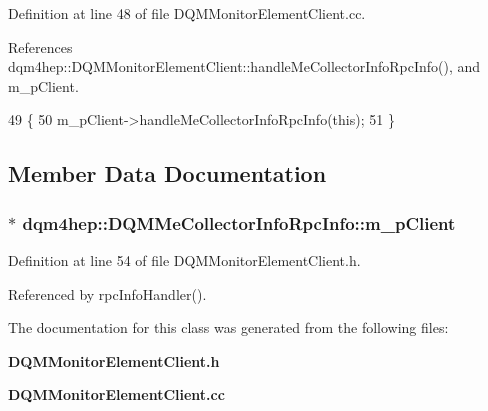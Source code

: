 Definition at line 48 of file D\+Q\+M\+Monitor\+Element\+Client.\+cc.



References dqm4hep\+::\+D\+Q\+M\+Monitor\+Element\+Client\+::handle\+Me\+Collector\+Info\+Rpc\+Info(), and m\+\_\+p\+Client.


\begin{DoxyCode}
49 \{
50   m_pClient->handleMeCollectorInfoRpcInfo(\textcolor{keyword}{this});
51 \}
\end{DoxyCode}


\subsection{Member Data Documentation}
\subsubsection[{m\+\_\+p\+Client}]{$\ast$ dqm4hep\+::\+D\+Q\+M\+Me\+Collector\+Info\+Rpc\+Info\+::m\+\_\+p\+Client\hspace{0.3cm}{\ttfamily [private]}}\label{classdqm4hep_1_1DQMMeCollectorInfoRpcInfo_a38dfa3df9389017c4cf14d1ff8b9ad0e}


Definition at line 54 of file D\+Q\+M\+Monitor\+Element\+Client.\+h.



Referenced by rpc\+Info\+Handler().



The documentation for this class was generated from the following files\+:\begin{DoxyCompactItemize}
\item 
{\bf D\+Q\+M\+Monitor\+Element\+Client.\+h}\item 
{\bf D\+Q\+M\+Monitor\+Element\+Client.\+cc}\end{DoxyCompactItemize}

